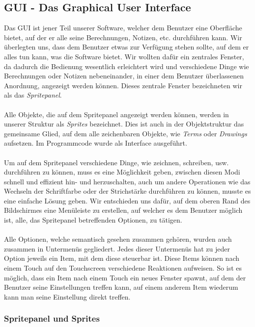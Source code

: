 \subsection{GUI - Das Graphical User Interface}

Das GUI ist jener Teil unserer Software, welcher dem Benutzer eine Oberfläche bietet, auf der er alle seine Berechnungen, Notizen, etc. durchführen kann. Wir überlegten uns, dass dem Benutzer etwas zur Verfügung stehen sollte, auf dem er alles tun kann, was die Software bietet. Wir wollten dafür ein zentrales Fenster, da dadurch die Bedienung wesentlich erleichtert wird und verschiedene Dinge wie Berechnungen oder Notizen nebeneinander, in einer dem Benutzer überlassenen Anordnung, angezeigt werden können. Dieses zentrale Fenster bezeichneten wir als das \textit{Spritepanel}.\\
\\
Alle Objekte, die auf dem Spritepanel angezeigt werden können, werden in unserer Struktur als \textit{Sprites} bezeichnet. Dies ist auch in der Objektstruktur das gemeinsame Glied, auf dem alle zeichenbaren Objekte, wie \textit{Terms} oder \textit{Drawings} aufsetzen. Im Programmcode wurde  als Interface ausgeführt.\\
\\
Um auf dem Spritepanel verschiedene Dinge, wie zeichnen, schreiben, usw. durchführen zu können, muss es eine Möglichkeit geben, zwischen diesen Modi schnell und effizient hin- und herzuschalten, auch um andere Operationen wie das Wechseln der Schriftfarbe oder der Strichstärke durchführen zu können, musste es eine einfache Lösung geben. Wir entschieden uns dafür, auf dem oberen Rand des Bildschirmes eine Menüleiste zu erstellen, auf welcher es dem Benutzer möglich ist, alle, das Spritepanel betreffenden Optionen, zu tätigen.\\
\\
Alle Optionen, welche semantisch gesehen zusammen gehören, wurden auch zusammen in Untermenüs gegliedert. Jedes dieser Untermenüs hat zu jeder Option jeweils ein Item, mit dem diese steuerbar ist. Diese Items können nach einem Touch auf den Touchscreen verschiedene Reaktionen aufweisen. So ist es möglich, dass ein Item nach einem Touch ein neues Fenster spawnt, auf dem der Benutzer seine Einstellungen treffen kann, auf einem anderem Item wiederum kann man seine Einstellung direkt treffen.\\

\subsubsection{Spritepanel und Sprites}

